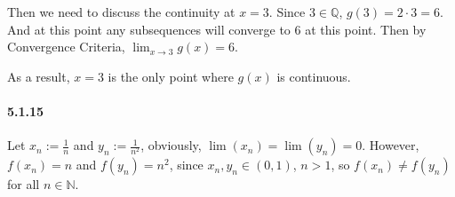 \documentclass[11pt]{article}
\begin{document}
	Then we need to discuss the continuity at $x = 3$. Since $3 \in \mathbb{Q}$, $g(3) = 2\cdot 3 = 6$. And at this point any subsequences will converge to $6$ at this point. Then by Convergence Criteria, $\lim_{x \rightarrow 3} g(x) = 6$.
	
	As a result, $x = 3$ is the only point where $g(x)$ is continuous. 
	\paragraph{5.1.15}
	Let $x_n := \frac{1}{n}$ and $y_n := \frac{1}{n^2}$, obviously, $\lim(x_n) = \lim(y_n) = 0$. However, $f(x_n) = n$ and $f(y_n) = n^2$, since $x_n, y_n \in (0, 1)$, $n > 1$, so $f(x_n) \neq f(y_n)$ for all $n \in \mathbb{N}$.
\end{document}
